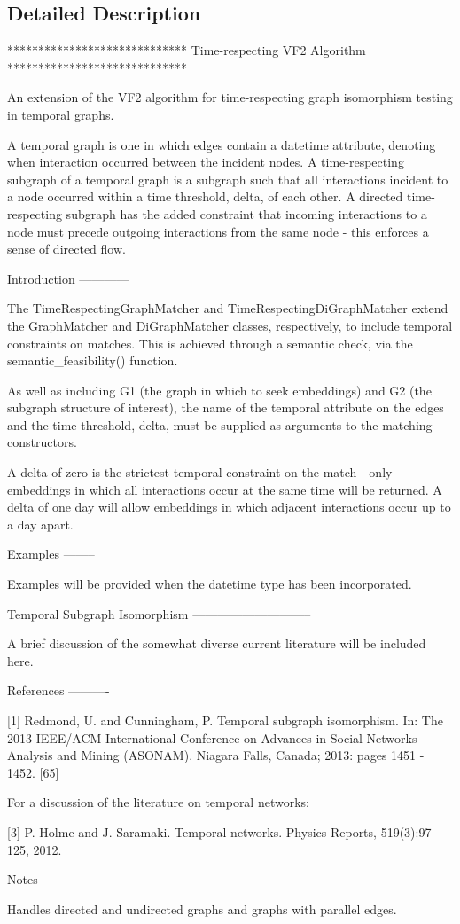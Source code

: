 \subsection{Detailed Description}
\begin{DoxyVerb}*****************************
Time-respecting VF2 Algorithm
*****************************

An extension of the VF2 algorithm for time-respecting graph isomorphism
testing in temporal graphs.

A temporal graph is one in which edges contain a datetime attribute,
denoting when interaction occurred between the incident nodes. A
time-respecting subgraph of a temporal graph is a subgraph such that
all interactions incident to a node occurred within a time threshold,
delta, of each other. A directed time-respecting subgraph has the
added constraint that incoming interactions to a node must precede
outgoing interactions from the same node - this enforces a sense of
directed flow.

Introduction
------------

The TimeRespectingGraphMatcher and TimeRespectingDiGraphMatcher
extend the GraphMatcher and DiGraphMatcher classes, respectively,
to include temporal constraints on matches. This is achieved through
a semantic check, via the semantic_feasibility() function.

As well as including G1 (the graph in which to seek embeddings) and
G2 (the subgraph structure of interest), the name of the temporal
attribute on the edges and the time threshold, delta, must be supplied
as arguments to the matching constructors.

A delta of zero is the strictest temporal constraint on the match -
only embeddings in which all interactions occur at the same time will
be returned. A delta of one day will allow embeddings in which
adjacent interactions occur up to a day apart.

Examples
--------

Examples will be provided when the datetime type has been incorporated.


Temporal Subgraph Isomorphism
-----------------------------

A brief discussion of the somewhat diverse current literature will be
included here.

References
----------

[1] Redmond, U. and Cunningham, P. Temporal subgraph isomorphism. In:
The 2013 IEEE/ACM International Conference on Advances in Social
Networks Analysis and Mining (ASONAM). Niagara Falls, Canada; 2013:
pages 1451 - 1452. [65]

For a discussion of the literature on temporal networks:

[3] P. Holme and J. Saramaki. Temporal networks. Physics Reports,
519(3):97–125, 2012.

Notes
-----

Handles directed and undirected graphs and graphs with parallel edges.\end{DoxyVerb}
 
